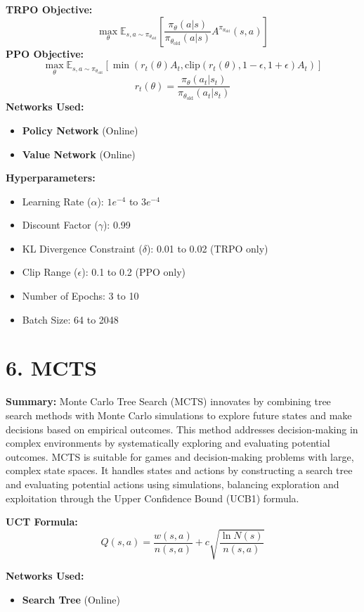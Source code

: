 \documentclass[a4paper,10pt]{article}
\begin{document}
\begin{multicols}{2}
\textbf{TRPO Objective:}
\[
\max_\theta \mathbb{E}_{s, a \sim \pi_{\theta_{\text{old}}}} \left[ \frac{\pi_\theta(a|s)}{\pi_{\theta_{\text{old}}}(a|s)} A^{\pi_{\theta_{\text{old}}}}(s, a) \right]
\]
\textbf{PPO Objective:}
\[
\max_\theta \mathbb{E}_{s, a \sim \pi_{\theta_{\text{old}}}} \left[ \min\left( r_t(\theta) A_t, \text{clip}(r_t(\theta), 1-\epsilon, 1+\epsilon) A_t \right) \right]
\]
\[
r_t(\theta) = \frac{\pi_\theta(a_t | s_t)}{\pi_{\theta_{\text{old}}}(a_t | s_t)}
\]
\textbf{Networks Used:}
\begin{itemize}
    \item \textbf{Policy Network} (Online)
    \item \textbf{Value Network} (Online)
\end{itemize}
\textbf{Hyperparameters:}
\begin{itemize}
    \item Learning Rate (\(\alpha\)): \(1e^{-4}\) to \(3e^{-4}\)
    \item Discount Factor (\(\gamma\)): 0.99
    \item KL Divergence Constraint (\(\delta\)): 0.01 to 0.02 (TRPO only)
    \item Clip Range (\(\epsilon\)): 0.1 to 0.2 (PPO only)
    \item Number of Epochs: 3 to 10
    \item Batch Size: 64 to 2048
\end{itemize}

\section*{6. MCTS}
\textbf{Summary:} Monte Carlo Tree Search (MCTS) innovates by combining tree search methods with Monte Carlo simulations to explore future states and make decisions based on empirical outcomes. This method addresses decision-making in complex environments by systematically exploring and evaluating potential outcomes. MCTS is suitable for games and decision-making problems with large, complex state spaces. It handles states and actions by constructing a search tree and evaluating potential actions using simulations, balancing exploration and exploitation through the Upper Confidence Bound (UCB1) formula.

\textbf{UCT Formula:}
\[
Q(s, a) = \frac{w(s, a)}{n(s, a)} + c \sqrt{\frac{\ln N(s)}{n(s, a)}}
\]

\textbf{Networks Used:}
\begin{itemize}
    \item \textbf{Search Tree} (Online)
\end{itemize}


\end{multicols}
\end{document}
